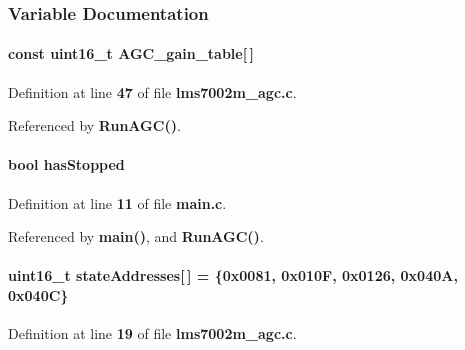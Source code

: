 \subsubsection{Variable Documentation}
\paragraph[{A\+G\+C\+\_\+gain\+\_\+table}]{\setlength{\rightskip}{0pt plus 5cm}const uint16\+\_\+t A\+G\+C\+\_\+gain\+\_\+table[$\,$]\hspace{0.3cm}{\ttfamily [static]}}\label{lms7002m__agc_8c_ada7637c6ba650283d996e02ab7dc13b9}


Definition at line {\bf 47} of file {\bf lms7002m\+\_\+agc.\+c}.



Referenced by {\bf Run\+A\+G\+C()}.

\paragraph[{has\+Stopped}]{\setlength{\rightskip}{0pt plus 5cm}bool has\+Stopped}\label{lms7002m__agc_8c_ac270116f25a6da3a3aca9b2d98ef648f}


Definition at line {\bf 11} of file {\bf main.\+c}.



Referenced by {\bf main()}, and {\bf Run\+A\+G\+C()}.

\paragraph[{state\+Addresses}]{\setlength{\rightskip}{0pt plus 5cm}uint16\+\_\+t state\+Addresses[$\,$] = \{0x0081, 0x010\+F, 0x0126, 0x040\+A, 0x040\+C\}\hspace{0.3cm}{\ttfamily [static]}}\label{lms7002m__agc_8c_a5f90da07c3e3f1b7ed880282764eac8e}


Definition at line {\bf 19} of file {\bf lms7002m\+\_\+agc.\+c}.



